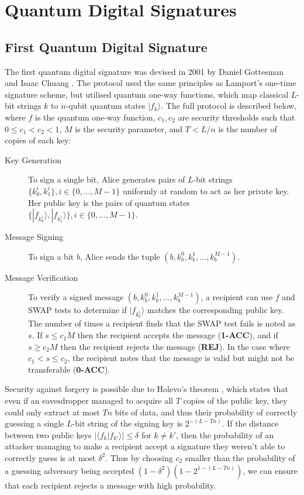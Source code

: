 \documentclass[%
 reprint,
 amsmath,amssymb,
 aps,
 pra,
]{revtex4-1}
\begin{document}
\section{Quantum Digital Signatures}

\subsection{First Quantum Digital Signature}

The first quantum digital signature was devised in 2001 by Daniel Gottesman and Isaac Chuang \citep{quant-ph/0105032}. The protocol used the same principles as Lamport's one-time signature scheme, but utilised quantum one-way functions, which map classical $L$-bit strings $k$ to $n$-qubit quantum states $|f_k\rangle$. The full protocol is described below, where $f$ is the quantum one-way function, $c_1, c_2$ are security thresholds such that $0 \leq c_1 < c_2 < 1$, $M$ is the security parameter, and $T < L/n$ is the number of copies of each key:

\begin{description}
\item[Key Generation]To sign a single bit, Alice generates pairs of $L$-bit strings $\{k^i_0, k^i_1\}, i \in \{0,...,M-1\}$ uniformly at random to act as her private key. Her public key is the pairs of quantum states $\{|f_{k^i_0}\rangle, |f_{k^i_1}\rangle\}, i \in \{0,...,M-1\}$.
\item[Message Signing]To sign a bit $b$, Alice sends the tuple $(b, k^0_b, k^1_b,...,k^{M-1}_b)$.
\item[Message Verification]To verify a signed message $(b, k^0_b, k^1_b,...,k^{M-1}_b)$, a recipient can use $f$ and SWAP tests \cite{PhysRevLett.87.167902} to determine if $|f_{k^i_b}\rangle$ matches the corresponding public key. The number of times a recipient finds that the SWAP test fails is noted as $s$. If $s \leq c_1M$ then the recipient accepts the message (\textbf{1-ACC}), and if $s \geq c_2M$ then the recipient rejects the message (\textbf{REJ}). In the case where $c_1 < s \leq c_2$, the recipient notes that the message is valid but might not be transferable (\textbf{0-ACC}).
\end{description}

Security against forgery is possible due to Holevo's theorem \cite{Hol73}, which states that even if an eavesdropper managed to acquire all $T$ copies of the public key, they could only extract at most $Tn$ bits of data, and thus their probability of correctly guessing a single $L$-bit string of the signing key is $2^{-(L-Tn)}$. If the distance between two public keys $|\langle f_k|f_{k'}\rangle| \leq \delta$ for $k \neq k'$, then the probability of an attacker managing to make a recipient accept a signature they weren't able to correctly guess is at most $\delta^2$. Thus by choosing $c_2$ smaller than the probability of a guessing adversary being accepted $(1 - \delta^2)(1 - 2^{1 - (L-Tn)})$, we can ensure that each recipient rejects a message with high probability.
\end{document}
